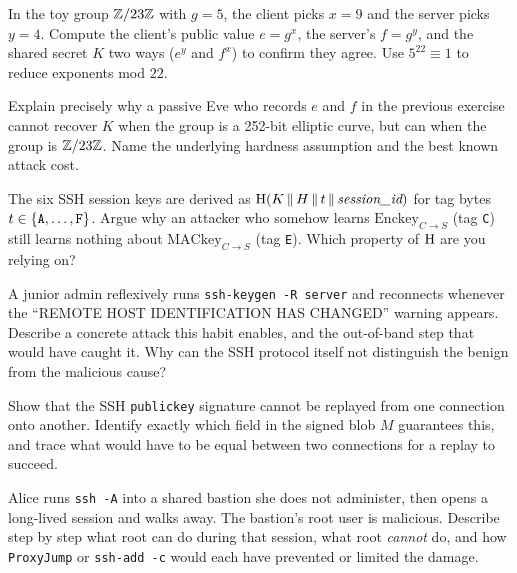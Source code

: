 \begin{exercise}
In the toy group $\mathbb{Z}/23\mathbb{Z}$ with $g = 5$, the client picks $x = 9$ and the server picks $y = 4$. Compute the client's public value $e = g^x$, the server's $f = g^y$, and the shared secret $K$ two ways ($e^y$ and $f^x$) to confirm they agree. Use $5^{22}\equiv 1$ to reduce exponents mod $22$.
\end{exercise}

\begin{exercise}
Explain precisely why a passive Eve who records $e$ and $f$ in the previous exercise cannot recover $K$ when the group is a 252-bit elliptic curve, but can when the group is $\mathbb{Z}/23\mathbb{Z}$. Name the underlying hardness assumption and the best known attack cost.
\end{exercise}

\begin{exercise}
The six SSH session keys are derived as $\operatorname{H}(K \,\|\, H \,\|\, t \,\|\, \textit{session\_id})$ for tag bytes $t \in \{\texttt{A},\dots,\texttt{F}\}$. Argue why an attacker who somehow learns $\text{Enckey}_{C\to S}$ (tag \texttt{C}) still learns nothing about $\text{MACkey}_{C\to S}$ (tag \texttt{E}). Which property of $\operatorname{H}$ are you relying on?
\end{exercise}

\begin{exercise}
A junior admin reflexively runs \texttt{ssh-keygen -R server} and reconnects whenever the ``REMOTE HOST IDENTIFICATION HAS CHANGED'' warning appears. Describe a concrete attack this habit enables, and the out-of-band step that would have caught it. Why can the SSH protocol itself not distinguish the benign from the malicious cause?
\end{exercise}

\begin{exercise}
Show that the SSH \texttt{publickey} signature cannot be replayed from one connection onto another. Identify exactly which field in the signed blob $M$ guarantees this, and trace what would have to be equal between two connections for a replay to succeed.
\end{exercise}

\begin{exercise}
Alice runs \texttt{ssh -A} into a shared bastion she does not administer, then opens a long-lived session and walks away. The bastion's root user is malicious. Describe step by step what root can do during that session, what root \emph{cannot} do, and how \texttt{ProxyJump} or \texttt{ssh-add -c} would each have prevented or limited the damage.
\end{exercise}

